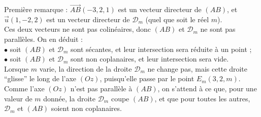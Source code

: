 \documentclass[a4paper, 11pt,reqno]{article}
\begin{document}
\begin{correction}
\begin{enumerate}
Premi\`ere remarque : $\overrightarrow{AB}(-3,2,1)$ est un vecteur directeur de $(AB)$, et $\vec{u}(1,-2,2)$ est un vecteur directeur de $\mathcal{D}_m$ (quel que soit le r\'eel $m$).\\
Ces deux vecteurs ne sont pas colin\'eaires, donc $(AB)$ et $\mathcal{D}_m$ ne sont pas parall\`eles. On en d\'eduit :\\
$\bullet$ soit $(AB)$ et $\mathcal{D}_m$ sont s\'ecantes, et leur intersection sera r\'eduite \`a un point ;\\
$\bullet$ soit $(AB)$ et $\mathcal{D}_m$ sont non coplanaires, et leur intersection sera vide.\\
Lorsque $m$ varie, la direction de la droite $\mathcal{D}_m$ ne change pas, mais cette droite ``glisse'' le long de l'axe $(Oz)$, puisqu'elle passe par le point $E_m(3,2,m)$.\\
Comme l'axe $(Oz)$ n'est pas parall\`ele \`a $(AB)$, on s'attend \`a ce que, pour une valeur de $m$ donn\'ee, la droite $\mathcal{D}_m$ coupe $(AB)$, et que pour toutes les autres, $\mathcal{D}_m$ et $(AB)$ soient non coplanaires.\\


\end{enumerate}
\end{correction}
\end{document}

